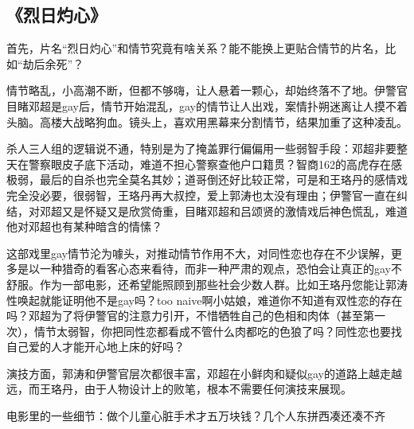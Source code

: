 \subsection{《烈日灼心》}
首先，片名“烈日灼心”和情节究竟有啥关系？能不能换上更贴合情节的片名，比如“劫后余死”？

情节略乱，小高潮不断，但都不够嗨，让人悬着一颗心，却始终落不了地。伊警官目睹邓超是gay后，情节开始混乱，gay的情节让人出戏，案情扑朔迷离让人摸不着头脑。高楼大战略狗血。镜头上，喜欢用黑幕来分割情节，结果加重了这种凌乱。

杀人三人组的逻辑说不通，特别是为了掩盖罪行偏偏用一些弱智手段：邓超非要整天在警察眼皮子底下活动，难道不担心警察查他户口籍贯？智商162的高虎存在感极弱，最后的自杀也完全莫名其妙；道哥倒还好比较正常，可是和王珞丹的感情戏完全没必要，很弱智，王珞丹再大叔控，爱上郭涛也太没有理由；伊警官一直在纠结，对邓超又是怀疑又是欣赏倚重，目睹邓超和吕颂贤的激情戏后神色慌乱，难道他对邓超也有某种暗含的情愫？

这部戏里gay情节沦为噱头，对推动情节作用不大，对同性恋也存在不少误解，更多是以一种猎奇的看客心态来看待，而非一种严肃的观点，恐怕会让真正的gay不舒服。作为一部电影，还希望能照顾到那些社会少数人群。比如王珞丹您能让郭涛性唤起就能证明他不是gay吗？too naive啊小姑娘，难道你不知道有双性恋的存在吗？邓超为了将伊警官的注意力引开，不惜牺牲自己的色相和肉体（甚至第一次），情节太弱智，你把同性恋都看成不管什么肉都吃的色狼了吗？同性恋也要找自己爱的人才能开心地上床的好吗？

演技方面，郭涛和伊警官层次都很丰富，邓超在小鲜肉和疑似gay的道路上越走越远，而王珞丹，由于人物设计上的败笔，根本不需要任何演技来展现。

电影里的一些细节：做个儿童心脏手术才五万块钱？几个人东拼西凑还凑不齐